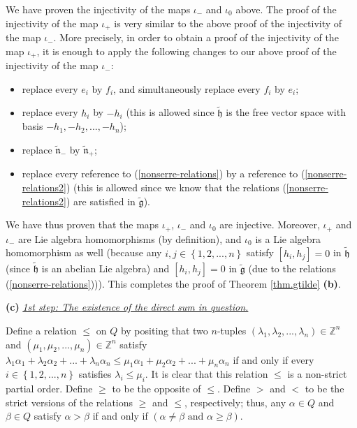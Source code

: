 \documentclass[etingof-lie.tex]{subfiles}
\begin{document}
\begin{verlong}
We have proven the injectivity of the maps $\iota_{-}$ and $\iota_{0}$ above.
The proof of the injectivity of the map $\iota_{+}$ is very similar to the
above proof of the injectivity of the map $\iota_{-}$. More precisely, in
order to obtain a proof of the injectivity of the map $\iota_{+}$, it is
enough to apply the following changes to our above proof of the injectivity of
the map $\iota_{-}$:

\begin{itemize}
\item replace every $e_{i}$ by $f_{i}$, and simultaneously replace every
$f_{i}$ by $e_{i}$;

\item replace every $h_{i}$ by $-h_{i}$ (this is allowed since
$\widetilde{\mathfrak{h}}$ is the free vector space with basis $-h_{1}%
,-h_{2},...,-h_{n}$);

\item replace $\widetilde{\mathfrak{n}}_{-}$ by $\widetilde{\mathfrak{n}}_{+}$;

\item replace every reference to (\ref{nonserre-relations}) by a reference to
(\ref{nonserre-relations2}) (this is allowed since we know that the relations
(\ref{nonserre-relations2}) are satisfied in $\widetilde{\mathfrak{g}}$).
\end{itemize}

We have thus proven that the maps $\iota_{+}$, $\iota_{-}$ and $\iota_{0}$ are
injective. Moreover, $\iota_{+}$ and $\iota_{-}$ are Lie algebra homomorphisms
(by definition), and $\iota_{0}$ is a Lie algebra homomorphism as well
(because any $i,j\in\left\{  1,2,...,n\right\}  $ satisfy $\left[  h_{i}%
,h_{j}\right]  =0$ in $\widetilde{\mathfrak{h}}$ (since
$\widetilde{\mathfrak{h}}$ is an abelian Lie algebra) and $\left[  h_{i}%
,h_{j}\right]  =0$ in $\widetilde{\mathfrak{g}}$ (due to the relations
(\ref{nonserre-relations}))). This completes the proof of Theorem
\ref{thm.gtilde} \textbf{(b)}.
\end{verlong}

\bigskip

\textbf{(c)} \underline{\textit{1st step: The existence of the direct sum in
question.}}

Define a relation $\leq$ on $Q$ by positing that two $n$-tuples $\left(
\lambda_{1},\lambda_{2},...,\lambda_{n}\right)  \in\mathbb{Z}^{n}$ and
$\left(  \mu_{1},\mu_{2},...,\mu_{n}\right)  \in\mathbb{Z}^{n}$ satisfy
$\lambda_{1}\alpha_{1}+\lambda_{2}\alpha_{2}+...+\lambda_{n}\alpha_{n}\leq
\mu_{1}\alpha_{1}+\mu_{2}\alpha_{2}+...+\mu_{n}\alpha_{n}$ if and only if
every $i\in\left\{  1,2,...,n\right\}  $ satisfies $\lambda_{i}\leq\mu_{i}$.
It is clear that this relation $\leq$ is a non-strict partial order. Define
$\geq$ to be the opposite of $\leq$. Define $>$ and $<$ to be the strict
versions of the relations $\geq$ and $\leq$, respectively; thus, any
$\alpha\in Q$ and $\beta\in Q$ satisfy $\alpha>\beta$ if and only if $\left(
\alpha\neq\beta\text{ and }\alpha\geq\beta\right)  $.
\end{document}
